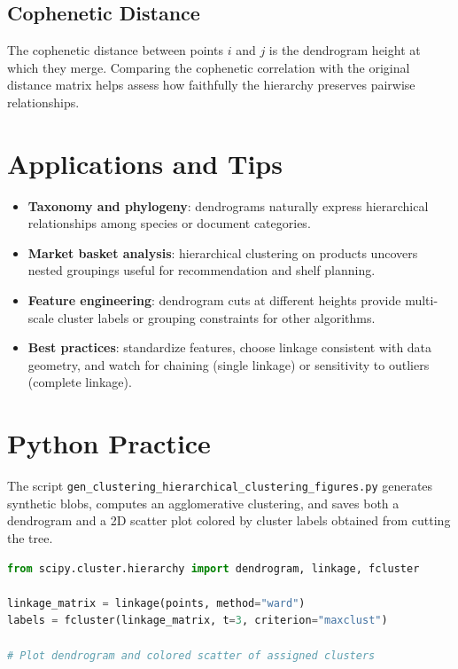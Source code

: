 ﻿\documentclass[12pt]{article}
\begin{document}
\subsection{Cophenetic Distance}
The cophenetic distance between points \(i\) and \(j\) is the dendrogram height at which they merge. Comparing the cophenetic correlation with the original distance matrix helps assess how faithfully the hierarchy preserves pairwise relationships.

\section{Applications and Tips}
\begin{itemize}
  \item \textbf{Taxonomy and phylogeny}: dendrograms naturally express hierarchical relationships among species or document categories.
  \item \textbf{Market basket analysis}: hierarchical clustering on products uncovers nested groupings useful for recommendation and shelf planning.
  \item \textbf{Feature engineering}: dendrogram cuts at different heights provide multi-scale cluster labels or grouping constraints for other algorithms.
  \item \textbf{Best practices}: standardize features, choose linkage consistent with data geometry, and watch for chaining (single linkage) or sensitivity to outliers (complete linkage).
\end{itemize}

\section{Python Practice}
The script \texttt{gen\_clustering\_hierarchical\_clustering\_figures.py} generates synthetic blobs, computes an agglomerative clustering, and saves both a dendrogram and a 2D scatter plot colored by cluster labels obtained from cutting the tree.
\begin{lstlisting}[language=Python,caption={Excerpt from gen_clustering_hierarchical_clustering_figures.py}]
from scipy.cluster.hierarchy import dendrogram, linkage, fcluster

linkage_matrix = linkage(points, method="ward")
labels = fcluster(linkage_matrix, t=3, criterion="maxclust")

# Plot dendrogram and colored scatter of assigned clusters
\end{lstlisting}
\end{document}
